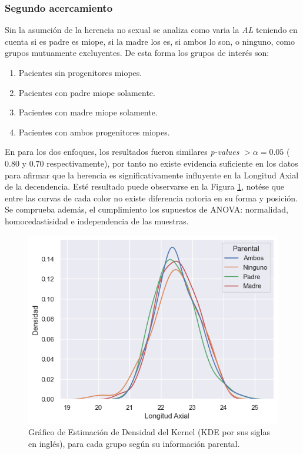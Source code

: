 \documentclass[a4paper,10pt,twocolumn]{article}
\begin{document}
	\subsubsection{Segundo acercamiento}
		Sin la asumción de la herencia no sexual se analiza como varia la \emph{AL} teniendo en cuenta si es padre es miope, si la madre los es, si ambos lo son, o ninguno, como grupos mutuamente excluyentes. De esta forma los grupos de interés son:
		
		\begin{enumerate}
			\item Pacientes sin progenitores miopes.
			\item Pacientes con padre miope solamente.
			\item Pacientes con madre miope solamente.
			\item Pacientes con ambos progenitores miopes.
		\end{enumerate}
	
	
		En para los dos enfoques, los resultados fueron similares \emph{p-values} $> \alpha = 0.05 $ ($0.80$ y $0.70$ respectivamente), por tanto no existe evidencia suficiente en los datos para afirmar que la herencia es significativamente influyente en la Longitud Axial de la decendencia. Esté resultado puede observarse en la Figura \ref{fig:3}, notése que entre las curvas de cada color no existe diferencia notoria en su forma y posición. Se comprueba además, el cumplimiento los supuestos de ANOVA: normalidad, homocedastisidad e independencia de las muestras. 
		
		\begin{figure}[htb]%
			\begin{center}
				\centering
				\includegraphics[height = .75\linewidth, width=.75\linewidth]{assets/AL_groups_kde}
			\end{center}
			\caption{Gráfico de Estimación de Densidad del Kernel (KDE por sus siglas en inglés), para cada grupo según su información parental.}
			\label{fig:3}
		\end{figure}
	
\end{document}
